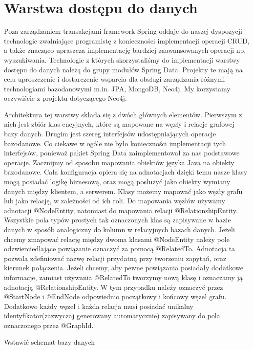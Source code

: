 \section{Warstwa dostępu do danych}

Poza zarządzaniem transakcjami framework Spring oddaje do naszej dyspozycji technologie zwalniające programistę z konieczności implementacji operacji CRUD, a także znacząco upraszcza implementację bardziej zaawansowanych operacji np. wyszukiwania. Technologie z których skorzystaliśmy do implementacji warstwy dostępu do danych należą do grupy modułów Spring Data. Projekty te mają na celu uproszczenie i dostarczenie wsparcia dla obsługi zarządzania różnymi technologiami bazodanowymi m.in. JPA, MongoDB, Neo4j. My korzystamy oczywiście z projektu dotyczącego Neo4j.

Architektura tej warstwy składa się z dwóch głównych elementów. Pierwszym z nich jest zbiór klas encyjnych, które są mapowane na węzły i relacje grafowej bazy danych. Drugim jest szereg interfejsów udostępniających operacje bazodanowe. Co ciekawe w ogóle nie było konieczności implementacji tych interfejsów, ponieważ pakiet Spring Data zaimplementował za nas podstawowe operacje. Zacznijmy od sposobu mapowania obiektów języka Java na obiekty bazodanowe. Cała konfiguracja opiera się na adnotacjach dzięki temu nasze klasy mogą posiadać logikę biznesową, oraz mogą posłużyć jako obiekty wymiany danych między klientem, a serwerem. Klasy możemy mapować jako węzły grafu lub jako relację, w zależności od ich roli. Do mapowania węzłów używamy adnotacji @NodeEntity, natomiast do mapowania relacji @RelationshipEntity. Wszystkie pola typów prostych tak oznaczonych klas są zapisywane w bazie danych w sposób analogiczny do kolumn w relacyjnych bazach danych. Jeżeli chcemy zmapować relację między dwoma klasami @NodeEntity należy pole odzwierciedlające powiązanie oznaczyć za pomocą @RelatedTo. Adnotacja ta pozwala zdefiniować nazwę relacji przydatną przy tworzeniu zapytań, oraz kierunek połączenia. Jeżeli chcemy, aby pewne powiązania posiadały dodatkowe informacje, zamiast używania @RelatedTo tworzymy nową klasę i oznaczamy ją adnotacją @RelationshipEntity. W tym przypadku należy oznaczyć przez @StartNode i @EndNode odpowiednio początkowy i końcowy węzeł grafu. Dodatkowo każdy węzeł i każda relacja musi posiadać unikalny identyfikator(zazwyczaj generowany automatycznie) zapisywany do pola oznaczonego przez @GraphId. 

Wstawić schemat bazy danych

